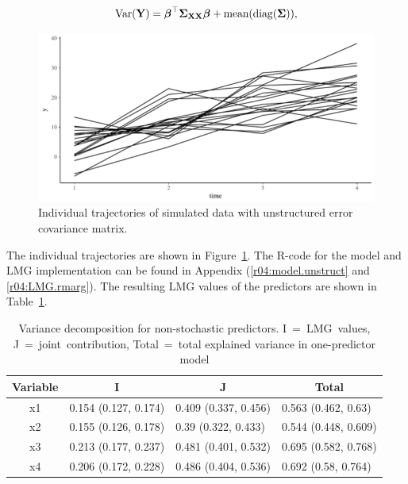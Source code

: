 \documentclass[11pt,a4paper,twoside]{book}
\newenvironment{knitrout}{}{} %
\begin{document}
      \begin{align} 
        \operatorname{Var}({\mathbf{Y}}) = {\boldsymbol{\beta}}^\top {\boldsymbol{\Sigma}}{}_{{\mathbf{X}} {\mathbf{X}}}  {\boldsymbol{\beta}} + \text{mean}(\operatorname{diag}({\boldsymbol{\Sigma}}{})),
   \end{align}



\begin{knitrout}
\color{fgcolor}\begin{figure}

{\centering \includegraphics[width=\textwidth-3cm]{figure/ch04_figsimdata_repeated_unstruct_plot-1} 

}

\caption[Individual trajectories of simulated data with unstructured error covariance matrix]{Individual trajectories of simulated data with unstructured error covariance matrix.}\label{fig:simdata.repeated.unstruct.plot}
\end{figure}


\end{knitrout}




The individual trajectories are shown in Figure~\ref{fig:simdata.repeated.unstruct.plot}. The R-code for the model and LMG implementation can be found in Appendix (\ref{r04:model.unstruct} and  \ref{r04:LMG.rmarg}). The resulting LMG values of the predictors are shown in Table~\ref{tbl:repeated.unstructured}.

\begin{table}[h]
\caption{Variance decomposition for non-stochastic predictors. I~=~LMG~values, J~=~joint~contribution, Total~=~total explained variance in one-predictor model}
\centering
\begin{tabular}{clll}
  \toprule
  \multicolumn{1}{c}{\textbf{Variable}} & \multicolumn{1}{c}{\textbf{I}} &\multicolumn{1}{c}{\textbf{J}} & \multicolumn{1}{c}{\textbf{Total}} \\
  \hline
x1 & 0.154 (0.127, 0.174)  & 0.409 (0.337, 0.456)   & 0.563 (0.462, 0.63)  \\ 
x2 & 0.155 (0.126, 0.178)  & 0.39 (0.322, 0.433)   & 0.544 (0.448, 0.609)  \\ 
x3 & 0.213 (0.177, 0.237)  & 0.481 (0.401, 0.532)   & 0.695 (0.582, 0.768)  \\ 
x4 & 0.206 (0.172, 0.228)  & 0.486 (0.404, 0.536)   & 0.692 (0.58, 0.764)  \\ 
   \bottomrule
\end{tabular}
\label{tbl:repeated.unstructured}
\end{table}



 

\end{document}

